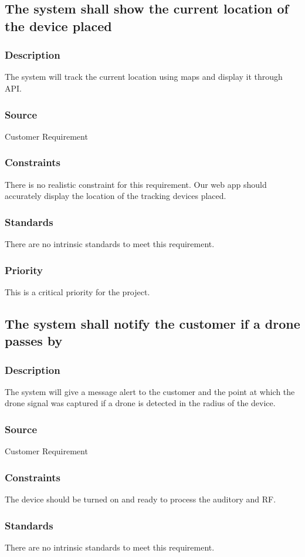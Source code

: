 \subsection{The system shall show the current location of the device placed}
\subsubsection{Description}
The system will track the current location using maps and display it through API.
\subsubsection{Source}
Customer Requirement
\subsubsection{Constraints}
There is no realistic constraint for this requirement. Our web app should accurately display the location of the tracking devices placed.
\subsubsection{Standards}
There are no intrinsic standards to meet this requirement.
\subsubsection{Priority}
This is a critical priority for the project.

\subsection{The system shall notify the customer if a drone passes by}
\subsubsection{Description}
The system will give a message alert to the customer and the point at which the drone signal was captured if a drone is detected in the radius of the device.
\subsubsection{Source}
Customer Requirement
\subsubsection{Constraints}
The device should be turned on and ready to process the auditory and RF.
\subsubsection{Standards}
There are no intrinsic standards to meet this requirement.
